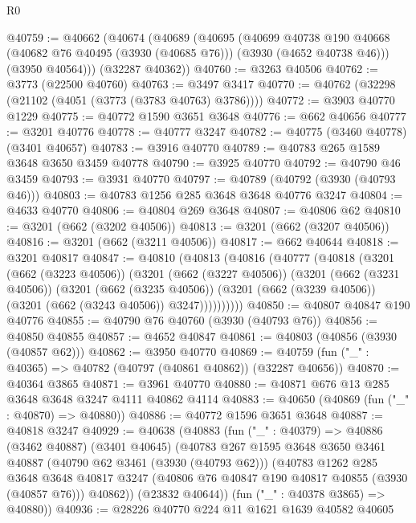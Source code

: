 \begin{lexlean}{R0}
\begin{coremodule}
@40759 := @40662
    (@40674
      (@40689
        (@40695
          (@40699
            @40738
            @190
            @40668
            (@40682 @76 @40495 (@3930 (@40685 @76)))
            (@3930 (@4652 @40738 @46)))
          (@3950 @40564)))
      (@32287 @40362))
@40760 := @3263 @40506
@40762 := @3773 (@22500 @40760)
@40763 := @3497 @3417
@40770 := @40762 (@32298 (@21102 (@4051 (@3773 (@3783 @40763) @3786))))
@40772 := @3903 @40770 @1229
@40775 := @40772 @1590 @3651 @3648
@40776 := @662 @40656
@40777 := @3201 @40776
@40778 := @40777 @3247
@40782 := @40775 (@3460 @40778) (@3401 @40657)
@40783 := @3916 @40770
@40789 := @40783 @265 @1589 @3648 @3650 @3459 @40778
@40790 := @3925 @40770
@40792 := @40790 @46 @3459
@40793 := @3931 @40770
@40797 := @40789 (@40792 (@3930 (@40793 @46)))
@40803 := @40783 @1256 @285 @3648 @3648 @40776 @3247
@40804 := @4633 @40770
@40806 := @40804 @269 @3648
@40807 := @40806 @62
@40810 := @3201 (@662 (@3202 @40506))
@40813 := @3201 (@662 (@3207 @40506))
@40816 := @3201 (@662 (@3211 @40506))
@40817 := @662 @40644
@40818 := @3201 @40817
@40847 := @40810
    (@40813
      (@40816
        (@40777
          (@40818
            (@3201
              (@662 (@3223 @40506))
              (@3201
                (@662 (@3227 @40506))
                (@3201
                  (@662 (@3231 @40506))
                  (@3201
                    (@662 (@3235 @40506))
                    (@3201 (@662 (@3239 @40506)) (@3201 (@662 (@3243 @40506)) @3247))))))))))
@40850 := @40807 @40847 @190 @40776
@40855 := @40790 @76 @40760 (@3930 (@40793 @76))
@40856 := @40850 @40855
@40857 := @4652 @40847
@40861 := @40803 (@40856 (@3930 (@40857 @62)))
@40862 := @3950 @40770
@40869 := @40759 (fun ("_" : @40365) => @40782 (@40797 (@40861 @40862)) (@32287 @40656))
@40870 := @40364 @3865
@40871 := @3961 @40770
@40880 := @40871 @676 @13 @285 @3648 @3648 @3247 @4111 @40862 @4114
@40883 := @40650 (@40869 (fun ("_" : @40870) => @40880))
@40886 := @40772 @1596 @3651 @3648
@40887 := @40818 @3247
@40929 := @40638
    (@40883
      (fun ("_" : @40379) =>
      @40886
        (@3462 @40887)
        (@3401 @40645)
        (@40783
          @267
          @1595
          @3648
          @3650
          @3461
          @40887
          (@40790 @62 @3461 (@3930 (@40793 @62)))
          (@40783
            @1262
            @285
            @3648
            @3648
            @40817
            @3247
            (@40806 @76 @40847 @190 @40817 @40855 (@3930 (@40857 @76)))
            @40862))
        (@23832 @40644))
      (fun ("_" : @40378 @3865) => @40880))
@40936 := @28226 @40770 @224 @11 @1621 @1639 @40582 @40605

\end{coremodule}
\end{lexlean}
